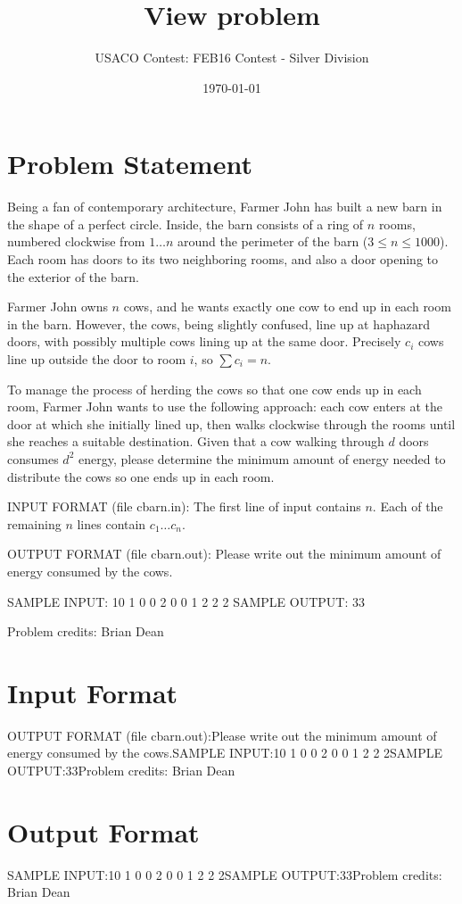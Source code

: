\documentclass[12pt]{article}
\title{View problem}
\author{USACO Contest: FEB16 Contest - Silver Division}
\date{\today}
\begin{document}
\maketitle

\section*{Problem Statement}

Being a fan of contemporary architecture, Farmer John has built a new barn in
the shape of a perfect circle.  Inside, the barn consists of a ring of $n$
rooms,  numbered clockwise from $1 \ldots n$ around the perimeter of the barn
($3 \leq n \leq 1000$).   Each room has doors to its two neighboring rooms, and
also a door opening to the exterior of the barn.

Farmer John owns $n$ cows, and he wants exactly one cow to end up in each room
in the barn.  However, the cows, being slightly confused, line up at haphazard
doors, with possibly multiple cows lining up at the same door.  Precisely $c_i$
cows line up outside the door to room $i$, so $\sum c_i = n$.

To manage the process of herding the cows so that one cow ends up in each room,
Farmer John wants to use the following approach: each cow enters at the door at
which she initially lined up, then walks clockwise through the rooms until she
reaches a suitable destination.  Given that a cow walking through $d$ doors
consumes $d^2$ energy, please determine the minimum amount of energy needed to
distribute the cows so one ends up in each room.  

INPUT FORMAT (file cbarn.in):
The first line of input contains $n$.  Each of the remaining $n$ lines contain
$c_1 \ldots c_n$.

OUTPUT FORMAT (file cbarn.out):
Please write out the minimum amount of energy consumed by the cows.  

SAMPLE INPUT:
10
1
0
0
2
0
0
1
2
2
2
SAMPLE OUTPUT: 
33

Problem credits: Brian Dean



\section*{Input Format}
OUTPUT FORMAT (file cbarn.out):Please write out the minimum amount of energy consumed by the cows.SAMPLE INPUT:10
1
0
0
2
0
0
1
2
2
2SAMPLE OUTPUT:33Problem credits: Brian Dean

\section*{Output Format}
SAMPLE INPUT:10
1
0
0
2
0
0
1
2
2
2SAMPLE OUTPUT:33Problem credits: Brian Dean
\end{document}
